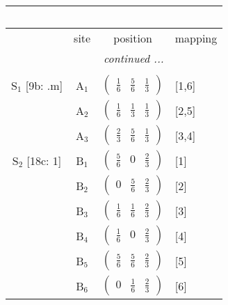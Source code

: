 \documentclass[fleqn,10pt,landscape]{article}
\begin{document}
\begin{itemize}
\begin{center}
\begin{longtable}{cc|c|l}
\multicolumn{3}{l}{\tablename\ \thetable{}} \\
 \hline \hline
 & site & position & mapping \\ \hline \endhead

 \hline \hline
\multicolumn{3}{r}{\footnotesize\it continued ...} \\ \endfoot

 \hline \hline
\multicolumn{3}{r}{} \\ \endlastfoot

S$_{1}$ [9b: .m] & A$_1$ & $\begin{pmatrix} \frac{1}{6} & \frac{5}{6} & \frac{1}{3} \end{pmatrix}$ & [1,6] \\
& A$_2$ & $\begin{pmatrix} \frac{1}{6} & \frac{1}{3} & \frac{1}{3} \end{pmatrix}$ & [2,5] \\
& A$_3$ & $\begin{pmatrix} \frac{2}{3} & \frac{5}{6} & \frac{1}{3} \end{pmatrix}$ & [3,4] \\ \hline
S$_{2}$ [18c: 1] & B$_1$ & $\begin{pmatrix} \frac{5}{6} & 0 & \frac{2}{3} \end{pmatrix}$ & [1] \\
& B$_2$ & $\begin{pmatrix} 0 & \frac{5}{6} & \frac{2}{3} \end{pmatrix}$ & [2] \\
& B$_3$ & $\begin{pmatrix} \frac{1}{6} & \frac{1}{6} & \frac{2}{3} \end{pmatrix}$ & [3] \\
& B$_4$ & $\begin{pmatrix} \frac{1}{6} & 0 & \frac{2}{3} \end{pmatrix}$ & [4] \\
& B$_5$ & $\begin{pmatrix} \frac{5}{6} & \frac{5}{6} & \frac{2}{3} \end{pmatrix}$ & [5] \\
& B$_6$ & $\begin{pmatrix} 0 & \frac{1}{6} & \frac{2}{3} \end{pmatrix}$ & [6] \\
\end{longtable}
\end{center}


\end{itemize}
\end{document}
